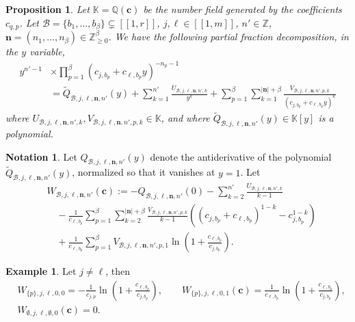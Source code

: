 \documentclass[a4paper]{amsart}
\newtheorem{proposition}[theorem]{Proposition}
\theoremstyle{remark}
\theoremstyle{definition}
\newtheorem{example}[theorem]{Example}
\newtheorem*{notation}{Notation}
\begin{document}
\begin{proposition}
\label{prop:pfd}
Let $\mathbb{K}=\mathbb{Q}(\mathbf{c})$ be the number field generated by the coefficients $c_{q,p}$. Let $\mathcal{B}=\{b_1,\ldots,b_{\beta}\} \subsetneq [\![1,r]\!]$, $j,\ell \in [\![1,m]\!]$, $n' \in \mathbb{Z}$, $\mathbf{n}=(n_1,\ldots,n_{\beta}) \in \mathbb{Z}_{\geq 0}^{\beta}$. We have the following partial fraction decomposition, in the $y$ variable,
\begin{align}
    y^{n'-1}& \times \prod_{p=1}^{\beta} \left( c_{j,b_p}+ c_{\ell,b_p} y \right)^{-n_p-1} \nonumber \\
    & = \widetilde{Q}_{\mathcal{B},j,\ell,\mathbf{n},n'}(y) + \sum_{k=1}^{n'} \frac{U_{\mathcal{B},j,\ell,\mathbf{n},n',k}}{y^k} + \sum_{p=1}^{\beta} \sum_{k=1}^{|\mathbf{n}|+\beta} \frac{V_{\mathcal{B},j,\ell,\mathbf{n},n',p,k}}{(c_{j,b_p}+ c_{\ell,b_p} y)^{k}} \label{eq:partial_fraction_decomposition}
\end{align}
where $U_{\mathcal{B},j,\ell,\mathbf{n},n',k}, V_{\mathcal{B},j,\ell,\mathbf{n},n',p,k} \in \mathbb{K}$, and where $\widetilde{Q}_{\mathcal{B},j,\ell,\mathbf{n},n'}(y) \in \mathbb{K}[y]$ is a polynomial.
\end{proposition}

\begin{notation}
Let $Q_{\mathcal{B},j,\ell,\mathbf{n},n'}(y)$ denote the antiderivative of the polynomial $\widetilde{Q}_{\mathcal{B},j,\ell,\mathbf{n},n'}(y)$, normalized so that it vanishes at $y=1$. Let
\begin{align}
    &W_{\mathcal{B},j,\ell,\mathbf{n},n'}(\mathbf{c}):= -Q_{\mathcal{B},j,\ell,\mathbf{n},n'}(0) - \sum_{k=2}^{n'} \frac{U_{\mathcal{B},j,\ell,\mathbf{n},n',k}}{k-1} \label{eq:def_coefficient_W} \\
    & \quad - \frac{1}{c_{\ell,b_p}} \sum_{p=1}^{\beta} \sum_{k=2}^{|\mathbf{n}|+\beta} \frac{V_{\mathcal{B},j,\ell,\mathbf{n},n',p,k}}{k-1} \left( (c_{j,b_p}+ c_{\ell,b_p})^{1-k} - c_{j,b_p}^{1-k} \right) \nonumber \\
    & \quad + \frac{1}{c_{\ell,b_p}} \sum_{p=1}^{\beta} V_{\mathcal{B},j,\ell,\mathbf{n},n',p,1} \ln \left( 1+\frac{c_{\ell,b_p}}{c_{j,b_p}} \right). \nonumber
\end{align}
\end{notation}

\begin{example}
\label{ex:W_constants}
Let $j \neq \ell$, then
\begin{align*}
    & W_{\{p\},j,\ell,0,0} = -\frac{1}{c_{j,p}} \ln\left( 1+\frac{c_{\ell,b_p}}{c_{j,b_p}} \right), \qquad W_{\{p\},j,\ell,0,1}(\mathbf{c})=\frac{1}{c_{\ell,b_p}} \ln\left( 1+\frac{c_{\ell,b_p}}{c_{j,b_p}} \right), \\
    & W_{\emptyset,j,\ell,\emptyset,0}(\mathbf{c})=0.
\end{align*}
\end{example}
\end{document}

